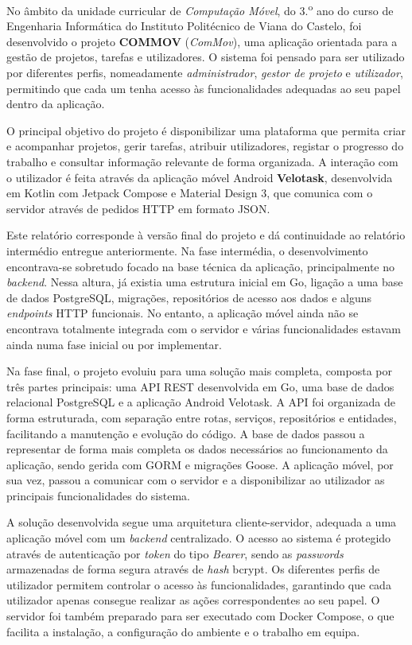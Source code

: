 \documentclass[12pt,a4paper]{article}
\begin{document}
No âmbito da unidade curricular de \textit{Computação Móvel}, do 3.\textsuperscript{o} ano do curso de Engenharia Informática do Instituto Politécnico de Viana do Castelo, foi desenvolvido o projeto \textbf{COMMOV} (\textit{ComMov}), uma aplicação orientada para a gestão de projetos, tarefas e utilizadores. O sistema foi pensado para ser utilizado por diferentes perfis, nomeadamente \textit{administrador}, \textit{gestor de projeto} e \textit{utilizador}, permitindo que cada um tenha acesso às funcionalidades adequadas ao seu papel dentro da aplicação.

O principal objetivo do projeto é disponibilizar uma plataforma que permita criar e acompanhar projetos, gerir tarefas, atribuir utilizadores, registar o progresso do trabalho e consultar informação relevante de forma organizada. A interação com o utilizador é feita através da aplicação móvel Android \textbf{Velotask}, desenvolvida em Kotlin com Jetpack Compose e Material Design 3, que comunica com o servidor através de pedidos HTTP em formato JSON.

Este relatório corresponde à versão final do projeto e dá continuidade ao relatório intermédio entregue anteriormente. Na fase intermédia, o desenvolvimento encontrava-se sobretudo focado na base técnica da aplicação, principalmente no \textit{backend}. Nessa altura, já existia uma estrutura inicial em Go, ligação a uma base de dados PostgreSQL, migrações, repositórios de acesso aos dados e alguns \textit{endpoints} HTTP funcionais. No entanto, a aplicação móvel ainda não se encontrava totalmente integrada com o servidor e várias funcionalidades estavam ainda numa fase inicial ou por implementar.

Na fase final, o projeto evoluiu para uma solução mais completa, composta por três partes principais: uma API REST desenvolvida em Go, uma base de dados relacional PostgreSQL e a aplicação Android Velotask. A API foi organizada de forma estruturada, com separação entre rotas, serviços, repositórios e entidades, facilitando a manutenção e evolução do código. A base de dados passou a representar de forma mais completa os dados necessários ao funcionamento da aplicação, sendo gerida com GORM e migrações Goose. A aplicação móvel, por sua vez, passou a comunicar com o servidor e a disponibilizar ao utilizador as principais funcionalidades do sistema.

A solução desenvolvida segue uma arquitetura cliente-servidor, adequada a uma aplicação móvel com um \textit{backend} centralizado. O acesso ao sistema é protegido através de autenticação por \textit{token} do tipo \textit{Bearer}, sendo as \textit{passwords} armazenadas de forma segura através de \textit{hash} bcrypt. Os diferentes perfis de utilizador permitem controlar o acesso às funcionalidades, garantindo que cada utilizador apenas consegue realizar as ações correspondentes ao seu papel. O servidor foi também preparado para ser executado com Docker Compose, o que facilita a instalação, a configuração do ambiente e o trabalho em equipa.
\end{document}
